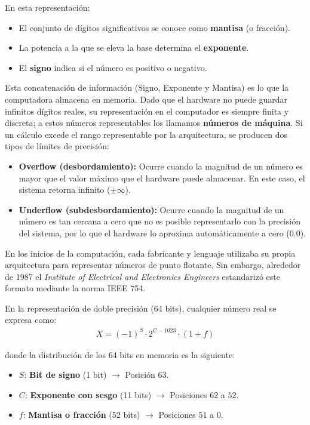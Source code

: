 \documentclass[12pt]{article}
\begin{document}
\noindent  En esta representación:
\begin{itemize}
    \item El conjunto de dígitos significativos se conoce como \textbf{mantisa} (o fracción).
    \item La potencia a la que se eleva la base determina el \textbf{exponente}.
    \item El \textbf{signo} indica si el número es positivo o negativo.
\end{itemize}

Esta concatenación de información (Signo, Exponente y Mantisa) es lo que la computadora 
almacena en memoria. Dado que el hardware no puede guardar infinitos dígitos reales, 
su representación en el computador es siempre finita y discreta; a estos números representables 
los llamamos \textbf{números de máquina}. Si un cálculo excede el rango representable por la
arquitectura, se producen dos tipos de límites de precisión:
\begin{itemize}
    \item \textbf{Overflow (desbordamiento):} Ocurre cuando la magnitud de un número es mayor que el valor máximo que el hardware puede almacenar. En este caso, el sistema retorna infinito ($\pm\infty$).
    \item \textbf{Underflow (subdesbordamiento):} Ocurre cuando la magnitud de un número es tan cercana a cero que no es posible representarlo con la precisión del sistema, por lo que el hardware lo aproxima automáticamente a cero ($0.0$).
\end{itemize}

En los inicios de la computación, cada fabricante y lenguaje utilizaba su propia arquitectura 
para representar números de punto flotante. Sin embargo, alrededor de 1987 el 
\textit{Institute of Electrical and Electronics Engineers} 
estandarizó este formato mediante la norma IEEE 754. 

En la representación de doble precisión (64 bits), cualquier número real se expresa como:
\begin{align*}
X = (-1)^S \cdot 2^{C - 1023} \cdot (1 + f)
\end{align*}

donde la distribución de los 64 bits en memoria es la siguiente:
\begin{itemize}
    \item $S$: \textbf{Bit de signo} (1 bit) $\rightarrow$ Posición $63$.
    \item $C$: \textbf{Exponente con sesgo} (11 bits) $\rightarrow$ Posiciones $62$ a $52$.
    \item $f$: \textbf{Mantisa o fracción} (52 bits) $\rightarrow$ Posiciones $51$ a $0$.
\end{itemize}
\end{document}
